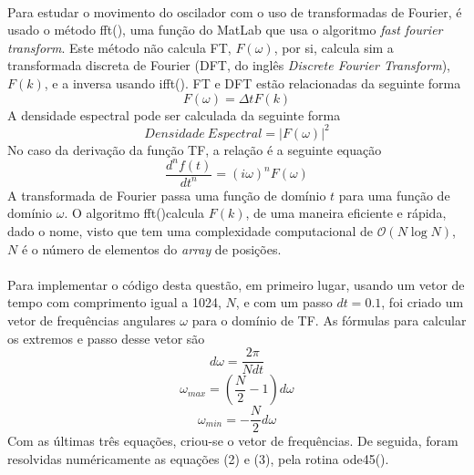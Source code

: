 \documentclass[a4paper, 11pt]{article}
\newcommand{\ode}{{\fontfamily{pcr}\selectfont ode45()}}
\newcommand{\fft}{{\fontfamily{pcr}\selectfont fft()}}
\newcommand{\ifft}{{\fontfamily{pcr}\selectfont ifft()}}
\newcommand{\arr}{\textit{array} }
\begin{document}
	\paragraph{}
	Para estudar o movimento do oscilador com o uso de transformadas de Fourier, é usado o método \fft, uma função do MatLab que usa o algoritmo \textit{fast fourier transform}. Este método não calcula FT, $F(\omega)$, por si, calcula sim a transformada discreta de Fourier (DFT, do inglês \textit{Discrete Fourier Transform}), $F(k)$, e a inversa usando \ifft. FT e DFT estão relacionadas da seguinte forma
	\begin{equation}
		F(\omega)=\Delta t F(k)
	\end{equation}
	A densidade espectral pode ser calculada da seguinte forma
	\begin{equation}
		Densidade\ Espectral = \left| F(\omega) \right|^{2}
	\end{equation}
	No caso da derivação da função TF, a relação é a seguinte equação
	\begin{equation}
		\frac{d^{n}f(t)}{dt^{n}}=(i\omega)^{n}F(\omega)
	\end{equation}
	A transformada de Fourier passa uma função de domínio $t$ para uma função de domínio $\omega$. O algoritmo \fft calcula $F(k)$, de uma maneira eficiente e rápida, dado o nome, visto que tem uma complexidade computacional de $\mathcal{O}(N\log{N})$, $N$ é o número de elementos do \arr de posições.
	\paragraph{}
	Para implementar o código desta questão, em primeiro lugar, usando um vetor de tempo com comprimento igual a 1024, $N$, e com um passo $dt=0.1$, foi criado um vetor de frequências angulares $\omega$ para o domínio de TF. As fórmulas para calcular os extremos e passo desse vetor são
	\begin{equation}
		d\omega=\frac{2\pi}{Ndt}
	\end{equation}
	\begin{equation}
		\omega_{max} = \left(\frac{N}{2} - 1\right)d\omega
	\end{equation}
	\begin{equation}
		\omega_{min} = -\frac{N}{2}d\omega
	\end{equation}
	Com as últimas três equações, criou-se o vetor de frequências. De seguida, foram resolvidas numéricamente as equações (2) e (3), pela rotina \ode.
	\newline
\end{document}
